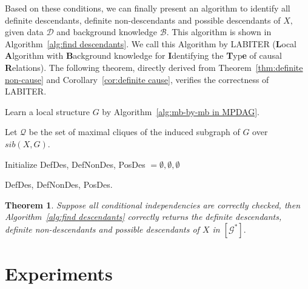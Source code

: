 \documentclass{article}
\newtheorem{theorem}{Theorem}
\begin{document}
Based on these conditions, we can finally present an algorithm to identify all definite descendants, definite non-descendants and possible descendants of $X,$ given data $\mathcal{D}$ and background knowledge $\mathcal{B}.$ This algorithm is shown in Algorithm~\ref{alg:find descendants}.
We call this Algorithm by LABITER (\textbf{L}ocal \textbf{A}lgorithm with \textbf{B}ackground knowledge for \textbf{I}dentifying the \textbf{T}yp\textbf{e} of causal \textbf{R}elations). The following theorem, directly derived from Theorem~\ref{thm:definite non-cause} and Corollary~\ref{cor:definite cause}, verifies the correctness of LABITER. 

\begin{algorithm}[t]
\LinesNumbered
\caption{LABITER: Local algorithm for finding all definite descendants, definite non-descendants and possible descendants of $X$ in $\mathcal{G}^*$.}
\label{alg:find descendants}
\small


Learn a local structure $G$ by Algorithm~\ref{alg:mb-by-mb in MPDAG}.

Let $\mathcal{Q}$ be the set of maximal cliques of the induced subgraph of $G$ over $sib(X,G).$

Initialize DefDes, DefNonDes, PosDes $=\emptyset, \emptyset, \emptyset$

 {
}
\Return DefDes, DefNonDes, PosDes.
\end{algorithm}

\begin{theorem}
Suppose all conditional independencies are correctly checked, then Algorithm~\ref{alg:find descendants} correctly returns the definite descendants, definite non-descendants and possible descendants of $X$ in $\left[\mathcal{G}^*\right].$
\end{theorem}

\section{Experiments}
\label{sec:experiments}
\end{document}
